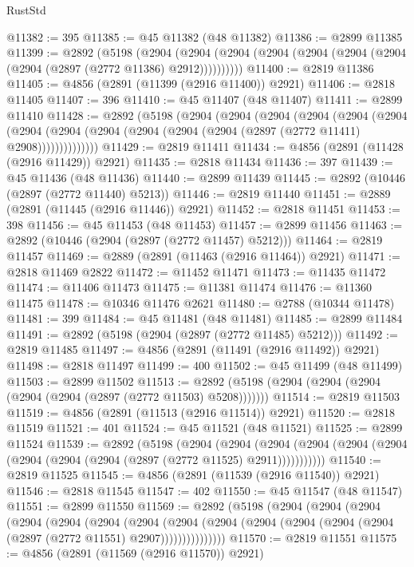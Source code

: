 \begin{lexlean}{RustStd}
\begin{coremodule}
@11382 := 395
@11385 := @45 @11382 (@48 @11382)
@11386 := @2899 @11385
@11399 := @2892
    (@5198
      (@2904 (@2904 (@2904 (@2904 (@2904 (@2904 (@2904 (@2904 (@2897 (@2772 @11386) @2912))))))))))
@11400 := @2819 @11386
@11405 := @4856 (@2891 (@11399 (@2916 @11400)) @2921)
@11406 := @2818 @11405
@11407 := 396
@11410 := @45 @11407 (@48 @11407)
@11411 := @2899 @11410
@11428 := @2892
    (@5198
      (@2904
        (@2904
          (@2904
            (@2904
              (@2904
                (@2904
                  (@2904
                    (@2904 (@2904 (@2904 (@2904 (@2904 (@2897 (@2772 @11411) @2908))))))))))))))
@11429 := @2819 @11411
@11434 := @4856 (@2891 (@11428 (@2916 @11429)) @2921)
@11435 := @2818 @11434
@11436 := 397
@11439 := @45 @11436 (@48 @11436)
@11440 := @2899 @11439
@11445 := @2892 (@10446 (@2897 (@2772 @11440) @5213))
@11446 := @2819 @11440
@11451 := @2889 (@2891 (@11445 (@2916 @11446)) @2921)
@11452 := @2818 @11451
@11453 := 398
@11456 := @45 @11453 (@48 @11453)
@11457 := @2899 @11456
@11463 := @2892 (@10446 (@2904 (@2897 (@2772 @11457) @5212)))
@11464 := @2819 @11457
@11469 := @2889 (@2891 (@11463 (@2916 @11464)) @2921)
@11471 := @2818 @11469 @2822
@11472 := @11452 @11471
@11473 := @11435 @11472
@11474 := @11406 @11473
@11475 := @11381 @11474
@11476 := @11360 @11475
@11478 := @10346 @11476 @2621
@11480 := @2788 (@10344 @11478)
@11481 := 399
@11484 := @45 @11481 (@48 @11481)
@11485 := @2899 @11484
@11491 := @2892 (@5198 (@2904 (@2897 (@2772 @11485) @5212)))
@11492 := @2819 @11485
@11497 := @4856 (@2891 (@11491 (@2916 @11492)) @2921)
@11498 := @2818 @11497
@11499 := 400
@11502 := @45 @11499 (@48 @11499)
@11503 := @2899 @11502
@11513 := @2892 (@5198 (@2904 (@2904 (@2904 (@2904 (@2904 (@2897 (@2772 @11503) @5208)))))))
@11514 := @2819 @11503
@11519 := @4856 (@2891 (@11513 (@2916 @11514)) @2921)
@11520 := @2818 @11519
@11521 := 401
@11524 := @45 @11521 (@48 @11521)
@11525 := @2899 @11524
@11539 := @2892
    (@5198
      (@2904
        (@2904
          (@2904 (@2904 (@2904 (@2904 (@2904 (@2904 (@2904 (@2897 (@2772 @11525) @2911)))))))))))
@11540 := @2819 @11525
@11545 := @4856 (@2891 (@11539 (@2916 @11540)) @2921)
@11546 := @2818 @11545
@11547 := 402
@11550 := @45 @11547 (@48 @11547)
@11551 := @2899 @11550
@11569 := @2892
    (@5198
      (@2904
        (@2904
          (@2904
            (@2904
              (@2904
                (@2904
                  (@2904
                    (@2904
                      (@2904 (@2904 (@2904 (@2904 (@2904 (@2897 (@2772 @11551) @2907)))))))))))))))
@11570 := @2819 @11551
@11575 := @4856 (@2891 (@11569 (@2916 @11570)) @2921)

\end{coremodule}
\end{lexlean}
